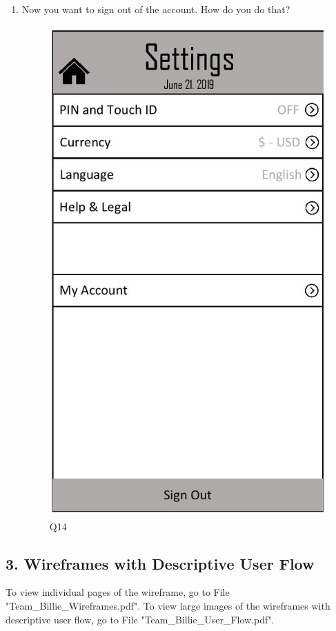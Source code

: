 \documentclass{sigchi}
\begin{document}
\begin{enumerate}
\newpage
\item Now you want to sign out of the account. How do you do that?
\begin{figure}[h!]
\centering
  \includegraphics[width=0.4\columnwidth]{14.jpg}
  \caption{Q14}
  \label{fig:ADfigure30}
\end{figure}

\end{enumerate}



 \newpage
 \newpage
 \subsection{3. Wireframes with Descriptive User Flow}
 To view individual pages of the wireframe, go to File "Team\_Billie\_Wireframes.pdf". To view large images of the wireframes with descriptive user flow, go to File "Team\_Billie\_User\_Flow.pdf".
 
\end{document}

